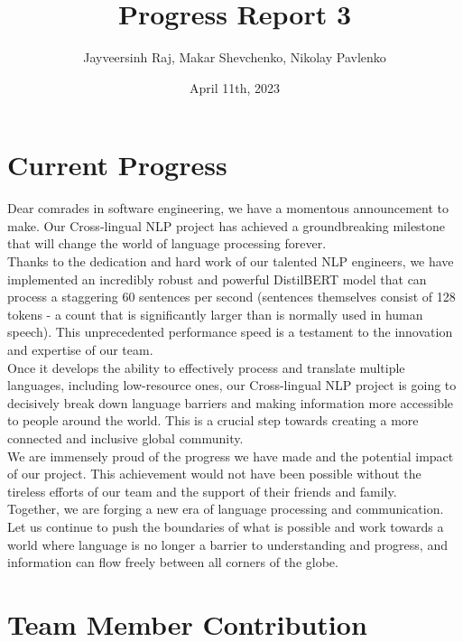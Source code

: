 \documentclass[]{article}
\title{Progress Report 3}
\author{Jayveersinh Raj, Makar Shevchenko, Nikolay Pavlenko}
\date{April 11th, 2023}
\begin{document}
	
	\maketitle
	
	\section{Current Progress}
	
	Dear comrades in software engineering, we have a momentous announcement to make. Our Cross-lingual NLP project has achieved a groundbreaking milestone that will change the world of language processing forever. \\
	
	\noindent
	Thanks to the dedication and hard work of our talented NLP engineers, we have implemented an incredibly robust and powerful DistilBERT model that can process a staggering 60 sentences per second (sentences themselves consist of 128 tokens - a count that is significantly larger than is normally used in human speech). This unprecedented performance speed is a testament to the innovation and expertise of our team. \\
	
	\noindent
	Once it develops the ability to effectively process and translate multiple languages, including low-resource ones, our Cross-lingual NLP project is going to decisively break down language barriers and making information more accessible to people around the world. This is a crucial step towards creating a more connected and inclusive global community. \\
	
	\noindent
	We are immensely proud of the progress we have made and the potential impact of our project. This achievement would not have been possible without the tireless efforts of our team and the support of their friends and family. \\
	
	\noindent
	Together, we are forging a new era of language processing and communication. Let us continue to push the boundaries of what is possible and work towards a world where language is no longer a barrier to understanding and progress, and information can flow freely between all corners of the globe. \\
	
	\section{Team Member Contribution}
	
\end{document}
